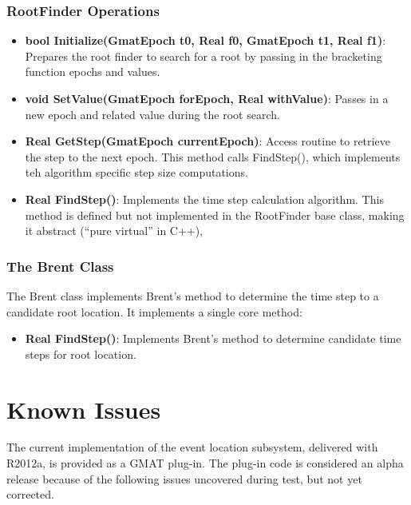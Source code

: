 \documentclass[letterpaper,10pt]{article}
\begin{document}
\subsubsection{RootFinder Operations}

\begin{itemize}
\item \textbf{bool Initialize(GmatEpoch t0, Real f0, GmatEpoch t1, Real f1)}:
Prepares the root finder to search for a root by passing in the bracketing
function epochs and values.
\item  \textbf{void SetValue(GmatEpoch forEpoch, Real withValue)}: Passes in a
new epoch and related value during the root search.
\item \textbf{Real GetStep(GmatEpoch currentEpoch)}: Access routine to retrieve
the step to the next epoch.  This method calls FindStep(), which implements teh
algorithm specific step size computations.
\item \textbf{Real FindStep()}:  Implements the time step calculation
algorithm.  This method is defined but not implemented in the RootFinder base
class, making it abstract (``pure virtual'' in C++),
\end{itemize}

\subsubsection{The Brent Class}

The Brent class implements Brent's method\cite{numrec} to determine the time
step to a candidate root location.  It implements a single core method:

\begin{itemize}
\item \textbf{Real FindStep()}:  Implements Brent's method to determine
candidate time steps for root location.
\end{itemize}

\section{Known Issues}

The current implementation of the event location subsystem, delivered with R2012a, is provided as a GMAT plug-in.  The plug-in code is considered an alpha release because of the following issues uncovered during test, but not yet corrected.
\end{document}
